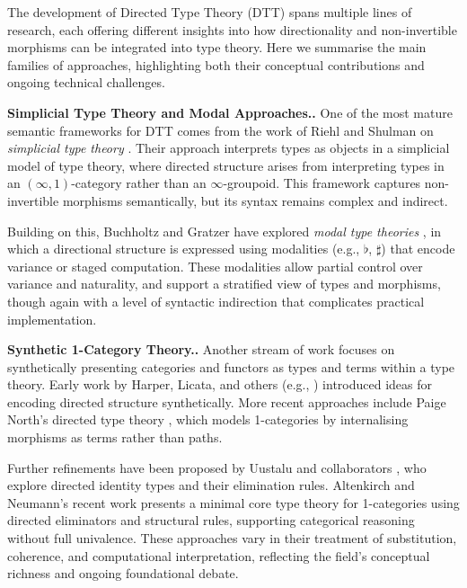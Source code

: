 \documentclass[a4paper,11pt]{article}
\let\oldcite\cite
\renewcommand*\cite[1]{{\protect\NoHyper\oldcite{#1}\protect\endNoHyper}}
\renewcommand{\paragraph}[1]{\textbf{#1.}}
\begin{document}
The development of Directed Type Theory (DTT) spans multiple lines of
research, each offering different insights into how directionality and
non-invertible morphisms can be integrated into type theory. Here we
summarise the main families of approaches, highlighting both their
conceptual contributions and ongoing technical challenges.

\paragraph{Simplicial Type Theory and Modal Approaches.}
One of the most mature semantic frameworks for DTT comes from the work
of Riehl and Shulman on \emph{simplicial type theory}
\cite{riehlshulman2017}. Their approach interprets types as objects in
a simplicial model of type theory, where directed structure arises
from interpreting types in an \((\infty,1)\)-category rather than an
\(\infty\)-groupoid. This framework captures non-invertible morphisms
semantically, but its syntax remains complex and indirect.

Building on this, Buchholtz and Gratzer have explored \emph{modal type
  theories} \cite{buchholtzgratzer2022}, in which a directional
structure is expressed using modalities (e.g., \(\flat\), \(\sharp\))
that encode variance or staged computation. These modalities allow
partial control over variance and naturality, and support a stratified
view of types and morphisms, though again with a level of syntactic
indirection that complicates practical implementation.

\paragraph{Synthetic 1-Category Theory.}
Another stream of work focuses on synthetically presenting categories
and functors as types and terms within a type theory. Early work by
Harper, Licata, and others (e.g., \cite{harperlicata2011}) introduced
ideas for encoding directed structure synthetically. More recent
approaches include Paige North’s directed type theory
\cite{north_2019}, which models 1-categories by internalising
morphisms as terms rather than paths.

Further refinements have been proposed by Uustalu and collaborators
\cite{uustalu2020}, who explore directed identity types and their
elimination rules. Altenkirch and Neumann’s recent work
\cite{altenkirch_neumann_2024} presents a minimal core type theory for
1-categories using directed eliminators and structural rules,
supporting categorical reasoning without full univalence. These
approaches vary in their treatment of substitution, coherence, and
computational interpretation, reflecting the field's conceptual
richness and ongoing foundational debate.
\end{document}
